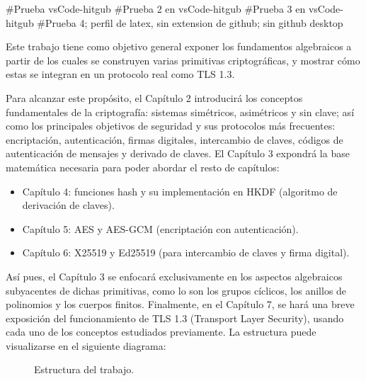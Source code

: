 #Prueba vsCode-hitgub
#Prueba 2 en vsCode-hitgub
#Prueba 3 en vsCode-hitgub
#Prueba 4; perfil de latex, sin extension de github; sin github desktop

Este trabajo tiene como objetivo general exponer los fundamentos algebraicos a partir de los cuales se construyen varias primitivas criptográficas, y mostrar cómo estas se integran en un protocolo real como TLS 1.3.

Para alcanzar este propósito, el Capítulo 2 introducirá los conceptos fundamentales de la criptografía: sistemas simétricos, asimétricos y sin clave; así como los principales objetivos de seguridad y sus protocolos más frecuentes: encriptación, autenticación, firmas digitales, intercambio de claves, códigos de autenticación de mensajes y derivado de claves. El Capítulo 3 expondrá la base matemática necesaria para poder abordar el resto de capítulos:
\begin{itemize}
	\item Capítulo 4: funciones hash y su implementación en HKDF (algoritmo de derivación de claves).
    \item Capítulo 5: AES y AES-GCM (encriptación con autenticación).
    \item Capítulo 6: X25519 y Ed25519 (para intercambio de claves y firma digital).
\end{itemize}
Así pues, el Capítulo 3 se enfocará exclusivamente en los aspectos algebraicos subyacentes de dichas primitivas, como lo son los grupos cíclicos, los anillos de polinomios y los cuerpos finitos. Finalmente, en el Capítulo 7, se hará una breve exposición del funcionamiento de TLS 1.3 (Transport Layer Security), usando cada uno de los conceptos estudiados previamente. La estructura puede visualizarse en el siguiente diagrama:

\begin{figure}[H]
\centering
{}
\caption{Estructura del trabajo.}
\end{figure}


